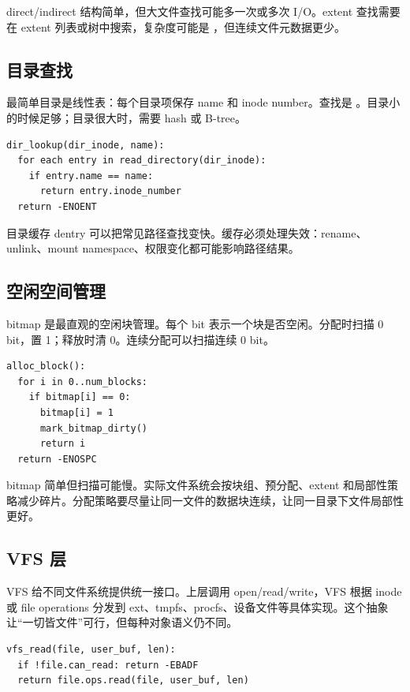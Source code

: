 direct/indirect 结构简单，但大文件查找可能多一次或多次 I/O。extent 查找需要在 extent 列表或树中搜索，复杂度可能是 ，但连续文件元数据更少。

\subsection{目录查找}

最简单目录是线性表：每个目录项保存 name 和 inode number。查找是 。目录小的时候足够；目录很大时，需要 hash 或 B-tree。

\begin{lstlisting}
dir_lookup(dir_inode, name):
  for each entry in read_directory(dir_inode):
    if entry.name == name:
      return entry.inode_number
  return -ENOENT
\end{lstlisting}

目录缓存 dentry 可以把常见路径查找变快。缓存必须处理失效：rename、unlink、mount namespace、权限变化都可能影响路径结果。

\subsection{空闲空间管理}

bitmap 是最直观的空闲块管理。每个 bit 表示一个块是否空闲。分配时扫描 0 bit，置 1；释放时清 0。连续分配可以扫描连续 0 bit。

\begin{lstlisting}
alloc_block():
  for i in 0..num_blocks:
    if bitmap[i] == 0:
      bitmap[i] = 1
      mark_bitmap_dirty()
      return i
  return -ENOSPC
\end{lstlisting}

bitmap 简单但扫描可能慢。实际文件系统会按块组、预分配、extent 和局部性策略减少碎片。分配策略要尽量让同一文件的数据块连续，让同一目录下文件局部性更好。

\subsection{VFS 层}

VFS 给不同文件系统提供统一接口。上层调用 open/read/write，VFS 根据 inode 或 file operations 分发到 ext、tmpfs、procfs、设备文件等具体实现。这个抽象让“一切皆文件”可行，但每种对象语义仍不同。

\begin{lstlisting}
vfs_read(file, user_buf, len):
  if !file.can_read: return -EBADF
  return file.ops.read(file, user_buf, len)
\end{lstlisting}

